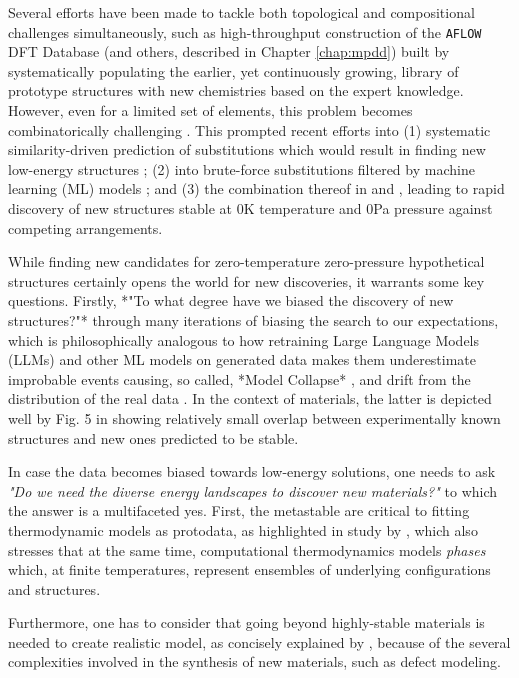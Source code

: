 Several efforts have been made to tackle both topological and compositional challenges simultaneously, such as high-throughput construction of the \texttt{AFLOW} \cite{Curtarolo2012} DFT Database \cite{Toher2018} (and others, described in Chapter \ref{chap:mpdd}) built by systematically populating the earlier, yet continuously growing, library of prototype structures \cite{Mehl2016} with new chemistries based on the expert knowledge. However, even for a limited set of elements, this problem becomes combinatorically challenging \cite{Krajewski2024Nimplex}. This prompted recent efforts into (1) systematic similarity-driven prediction of substitutions which would result in finding new low-energy structures \cite{Wang2021}; (2) into brute-force substitutions filtered by machine learning (ML) models \cite{Schmidt2023}; and (3) the combination thereof in \citet{Ye2022} and \citet{Merchant2023}, leading to rapid discovery of new structures stable at 0K temperature and 0Pa pressure against competing arrangements.

While finding new candidates for zero-temperature zero-pressure hypothetical structures certainly opens the world for new discoveries, it warrants some key questions. Firstly, *"To what degree have we biased the discovery of new structures?"* through many iterations of biasing the search to our expectations, which is philosophically analogous to how retraining Large Language Models (LLMs) and other ML models on generated data makes them underestimate improbable events causing, so called, *Model Collapse* \cite{Shumailov2023}, and drift from the distribution of the real data \cite{Alemohammad2023}. In the context of materials, the latter is depicted well by Fig. 5 in \citet{Ye2022} showing relatively small overlap between experimentally known structures and new ones predicted to be stable.

In case the data becomes biased towards low-energy solutions, one needs to ask \textit{"Do we need the diverse energy landscapes to discover new materials?"} to which the answer is a multifaceted yes. First, the metastable are critical to fitting thermodynamic models as protodata, as highlighted in study by \citet{Olson2023}, which also stresses that at the same time, computational thermodynamics models \emph{phases} which, at finite temperatures, represent ensembles of underlying configurations and structures. 

Furthermore, one has to consider that going beyond highly-stable materials is needed to create realistic model, as concisely explained by \citet{Zunger2019}, because of the several complexities involved in the synthesis of new materials, such as defect modeling. 

